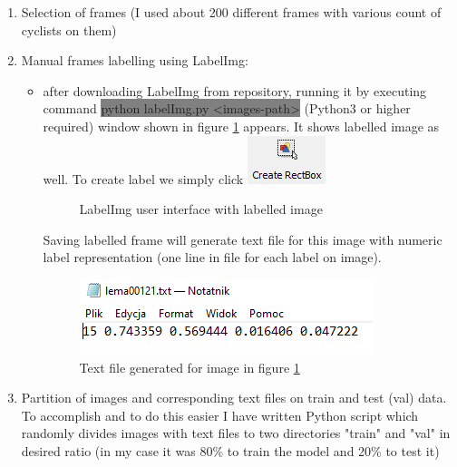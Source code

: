 \begin{enumerate}
\begin{itemize}
    \end{itemize}
    \item Selection of frames (I used about 200 different frames with various count of cyclists on them)
    \item Manual frames labelling using LabelImg:
    \begin{itemize}
        \item after downloading LabelImg from repository, running it by executing command \colorbox{Gray}{python labelImg.py <images-path>} (Python3 or higher required) window shown in figure \ref{fig:labelimg1} appears. It shows labelled image as well. To create label we simply click \includegraphics[scale=0.75]{images/button}
        \begin{figure}[H]
            \centering
            \caption{LabelImg user interface with labelled image}
            \label{fig:labelimg1}
        \end{figure}
        Saving labelled frame will generate text file for this image with numeric label representation (one line in file for each label on image).
        \begin{figure}[H]
            \centering
            \includegraphics{images/text}
            \caption{Text file generated for image in figure \ref{fig:labelimg1}}
            \label{fig:labelimg2}
        \end{figure}
    \end{itemize}
    \item Partition of images and corresponding text files on train and test (val) data. To accomplish and to do this easier I have written Python script which randomly divides images with text files to two directories "train" and "val" in desired ratio (in my case it was 80\% to train the model and 20\% to test it)
\end{enumerate}

